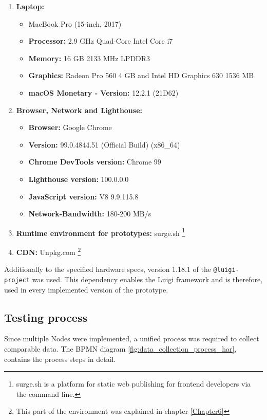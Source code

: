 \begin{enumerate}
	\item \textbf{Laptop:}
	\begin{itemize}[noitemsep]
		\item MacBook Pro (15-inch, 2017)
		\item \textbf{Processor:} 2.9 GHz Quad-Core Intel Core i7
		\item \textbf{Memory:} 16 GB 2133 MHz LPDDR3 
		\item \textbf{Graphics:} Radeon Pro 560 4 GB and Intel HD Graphics 630 1536 MB
		\item \textbf{macOS Monetary - Version:} 12.2.1 (21D62)
	\end{itemize} 
	
	\item \textbf{Browser, Network and Lighthouse:}
	\begin{itemize}[noitemsep]
		\item \textbf{Browser:} Google Chrome
		\item \textbf{Version:} 99.0.4844.51 (Official Build) (x86\_64)
		\item \textbf{Chrome DevTools version:} Chrome 99
		\item \textbf{Lighthouse version:} 100.0.0.0
		\item \textbf{JavaScript version:} V8 9.9.115.8
		\item \textbf{Network-Bandwidth:} 180-200 MB/s
	\end{itemize}
	
	\item \textbf{Runtime environment for prototypes:} surge.sh \footnote{surge.sh is a platform for static web publishing
		for frontend developers via the command line.}
	
	\item \textbf{CDN:} Unpkg.com \footnote{This part of the environment was explained in chapter \ref{Chapter6}}
\end{enumerate}

Additionally to the specified hardware specs, version 1.18.1 of the \texttt{@luigi-project} was used. This dependency enables the Luigi framework and is therefore, used in every implemented version of the prototype.

\subsection{Testing process}

Since multiple Nodes were implemented, a unified process was required to collect comparable data. The BPMN diagram \ref{fig:data_collection_process_har}, contains the process steps in detail.


